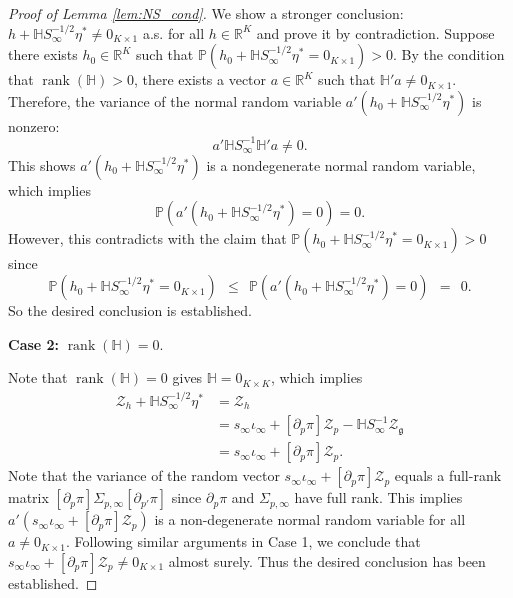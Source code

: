\documentclass[11pt]{article}
\theoremstyle{definition}
\DeclareMathOperator*{\rank}{rank}
\newcommand{\R}{\ensuremath{\mathbb{R}}}
\newcommand{\Prob}{\ensuremath{\mathbb{P}}} %
\newcommand{\0}{\ensuremath{\mathbf{0}}}
\begin{document}
\begin{bibunit}
\begin{proof}[Proof of Lemma \ref{lem:NS_cond}]
We show a stronger conclusion: $h + \mathbb{H}S_{\infty}^{-1/2} \eta^* \neq 0_{K\times 1}$ a.s. for all $h\in\R^K$ and prove it by contradiction. Suppose there exists $h_0 \in \R^K$ such that $\Prob(h_0 + \mathbb{H}S_{\infty}^{-1/2}\eta^* = 0_{K\times 1}) > 0$. By the condition that $\rank(\mathbb{H}) > 0$, there exists a vector $a \in \R^K$ such that $\mathbb{H}'a \neq 0_{K\times 1}$. Therefore, the variance of the normal random variable $a'(h_0 + \mathbb{H} S_{\infty}^{-1/2} \eta^*)$ is nonzero:
\[
    a'\mathbb{H} S_{\infty}^{-1} \mathbb{H}' a \neq 0.
\]
This shows $a'(h_0 + \mathbb{H} S_{\infty}^{-1/2} \eta^*)$ is a nondegenerate normal random variable, which implies 
\[
    \Prob(a'(h_0 + \mathbb{H} S_{\infty}^{-1/2} \eta^*) = 0) = 0.
\]
However, this contradicts with the claim that $\Prob(h_0 + \mathbb{H} S_{\infty}^{-1/2} \eta^* = 0_{K\times 1}) > 0$ since 
\[
    \Prob(h_0 + \mathbb{H} S_{\infty}^{-1/2} \eta^* = 0_{K\times 1}) ~~\leq~~ \Prob(a'(h_0 + \mathbb{H} S_{\infty}^{-1/2} \eta^*) = 0) ~~=~~0.
\]
So the desired conclusion is established.

\medskip
\textbf{Case 2:} $\rank(\mathbb{H}) = 0$.
\medskip

%
%
%
%
%
%
%
%
%
%
%
%
%

%

Note that $\rank(\mathbb{H}) = 0$ gives $\mathbb{H} = 0_{K\times K}$, which implies
\begin{align*}
    \mathcal{Z}_h + \mathbb{H} S_\infty^{-1/2}\eta^*   
    &= \mathcal{Z}_h \\
    &= s_\infty\iota_\infty + [\partial_p \pi] \mathcal{Z}_p - \mathbb{H} S_\infty^{-1} \mathcal{Z}_{\mathfrak{g}} \\
    &= s_\infty\iota_\infty + [\partial_p \pi] \mathcal{Z}_p.
\end{align*}
Note that the variance of the random vector $s_\infty\iota_\infty + [\partial_p \pi] \mathcal{Z}_p$ equals a full-rank matrix $[\partial_p \pi] \Sigma_{p,\infty} [\partial_{p'} \pi]$ since $\partial_p \pi$ and $\Sigma_{p,\infty}$ have full rank. This implies $a'( s_\infty\iota_\infty + [\partial_p \pi] \mathcal{Z}_p)$ is a non-degenerate normal random variable for all $a\neq 0_{K\times 1}$. Following similar arguments in Case 1, we conclude that $s_\infty\iota_\infty + [\partial_p \pi] \mathcal{Z}_p \neq 0_{K\times 1}$ almost surely. Thus the desired conclusion has been established.
\end{proof}



\bigskip



\end{bibunit}
\end{document}
